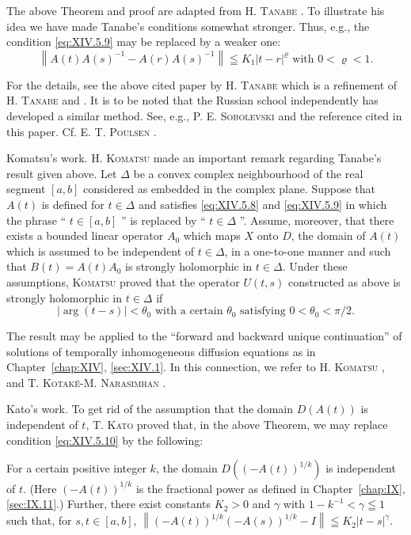 
The above Theorem and proof are adapted from H. \textsc{Tanabe} \cite{tanabe315}. To illustrate his idea we have made Tanabe's conditions somewhat stronger. Thus, e.g., the condition \eqref{eq:XIV.5.9} may be replaced by a weaker one: 
\[
\left\| A (t) A (s) ^{-1} - A (r) A (s) ^{-1} \right\| \leqq K _{1} | t - r | ^{\varrho} \text{ with } 0 < \varrho < 1.
\]

For the details, see the above cited paper by H. \textsc{Tanabe} which is a refinement of H. \textsc{Tanabe} \cite{tanabe316} and \cite{tanabe317}. It is to be noted that the Russian school independently has developed a similar method. See, e.g., P. E. \textsc{Sobolevski} \cite{sobolevski308} and the reference cited in this paper. Cf. E. T. \textsc{Poulsen} \cite{poulsen264}. 

Komatsu's work. H. \textsc{Komatsu} \cite{komatsu153} made an important remark regarding Tanabe's result given above. Let $\Delta$ be a convex complex neighbourhood of the real segment $[a, b]$ considered as embedded in the complex plane. Suppose that $A(t)$ is defined for $t \in \Delta$ and satisfies \eqref{eq:XIV.5.8} and \eqref{eq:XIV.5.9} in which the phrase `` $t \in [a, b]$ '' is replaced by `` $t \in \Delta$ ''. Assume, moreover, that there exists a bounded linear operator $A_0$ which maps $X$ onto $D$, the domain of $A(t)$ which is assumed to be independent of $t \in \Delta$, in a one-to-one manner and such that $B(t) = A(t)A_0$ is strongly holomorphic in $t \in \Delta$. Under these assumptions, \textsc{Komatsu} proved that the operator $U(t, s)$ constructed as above is strongly holomorphic in $t \in \Delta$ if 
\[
\left| \arg (t - s) \right| < \theta_{0} \text{ with a certain } \theta_{0} \text{ satisfying } 0 < \theta_{0} < \pi / 2.
\]

The result may be applied to the ``forward and backward unique continuation'' of solutions of temporally inhomogeneous diffusion equations as in Chapter~\ref{chap:XIV}, \ref{sec:XIV.1}. In this connection, we refer to H. \textsc{Komatsu} \cite{komatsu154}, \cite{komatsu155} and T. \textsc{Kotaké}-M. \textsc{Narasimhan} \cite{konishi162}. 

Kato's work. To get rid of the assumption that the domain $D(A(t))$ is independent of $t$, T. \textsc{Kato} \cite{kato139} proved that, in the above Theorem, we may replace condition \eqref{eq:XIV.5.10} by the following: 

For a certain positive integer $k$, the domain $D\left((-A(t))^{1/k}\right)$ is independent of $t$. (Here $(-A(t))^{1/k}$ is the fractional power as defined in Chapter~\ref{chap:IX}, \ref{sec:IX.11}.) Further, there exist constants $K_{2} > 0$ and $\gamma$ with $1 - k^{-1} < \gamma \leqq 1$ such that, for $s, t \in [a, b]$, $\left\| (-A(t))^{1/k}(-A(s))^{1/k} - I \right\| \leqq K_{2}|t - s|^{\gamma}$. 

